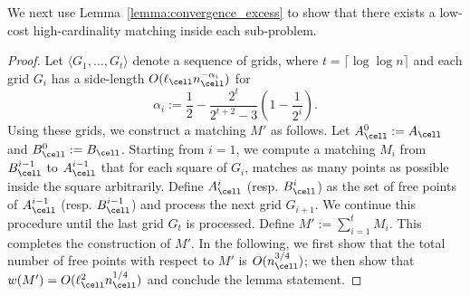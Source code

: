 We next use Lemma~\ref{lemma:convergence_excess} to show that there exists a low-cost high-cardinality matching inside each sub-problem.

\GRSPartialMatching*
\begin{proof}
    Let $\langle G_1, \ldots, G_t\rangle$ denote a sequence of grids, where $t=\lceil \log\log n\rceil$ and each grid $G_i$ has a side-length $O(\ell_\cell n_\cell^{-\alpha_i})$ for \[\alpha_i:=\frac{1}{2} - \frac{2^t}{2^{t+2} - 3}\left(1-\frac{1}{2^i}\right).\]
    Using these grids, we construct a matching $M'$ as follows.
    Let $A_\cell^0:=A_\cell$ and $B_\cell^0:=B_\cell$. Starting from $i=1$, we compute a matching $M_i$ from $B_\cell^{i-1}$ to $A_\cell^{i-1}$ that for each square of $G_i$, matches as many points as possible inside the square arbitrarily. Define $A_\cell^i$ (resp. $B_\cell^i$) as the set of free points of $A_\cell^{i-1}$ (resp. $B_\cell^{i-1}$) and process the next grid $G_{i+1}$. We continue this procedure until the last grid $G_t$ is processed. Define $M':=\sum_{i=1}^t M_i$. This completes the construction of $M'$. In the following, we first show that the total number of free points with respect to $M'$ is $O(n_\cell^{3/4})$; we then show that $w(M')=O(\ell_\cell^2n_\cell^{1/4})$ and conclude the lemma statement.


\end{proof}
